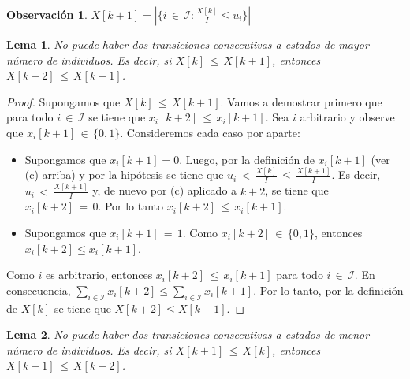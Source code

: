 \documentclass{article}
\newtheorem{lema}{Lema}
\newtheorem{obs}{Observación}
\begin{document}
\begin{obs}
$X[k{+}1]=|\{i\,{\in}\,\mathcal{I}:\frac{X[k]}{I}\leq u_i\}|$
\end{obs}

\begin{lema}\label{lema1}
No puede haber dos transiciones consecutivas a estados de mayor número de individuos. Es decir, si $X[k]\,{\leq}\,X[k{+}1]$, entonces $X[k{+}2]\,{\leq}\, X[k{+}1]$.
\end{lema}
\begin{proof}
Supongamos que $X[k]\,{\leq}\,X[k{+}1]$. Vamos a demostrar primero que para todo $i\,{\in}\,\mathcal{I}$ se tiene que $x_i[k{+}2]\,{\leq}\, x_i[k{+}1]$. Sea $i$ arbitrario y observe que $x_i[k{+}1]\,{\in}\,\{0, 1\}$. Consideremos cada caso por aparte:
%
\begin{itemize}
\item Supongamos que $x_i[k{+}1]=0$. Luego, por la definición de $x_i[k{+}1]$ (ver (c) arriba) y por la hipótesis se tiene que $u_i\,{<}\,\frac{X[k]}{I}\,{\leq}\,\frac{X[k{+}1]}{I}$. Es decir, $u_i\,{<}\,\frac{X[k{+}1]}{I}$ y, de nuevo por (c) aplicado a $k{+}2$, se tiene que $x_i[k{+}2]\,{=}\,0$. Por lo tanto $x_i[k{+}2]\,{\leq}\,x_i[k{+}1]$.
\item Supongamos que $x_i[k{+}1]\,{=}\,1$. Como $x_i[k{+}2]\,{\in}\,\{0,1\}$, entonces $x_i[k{+}2]\leq x_i[k{+}1]$.
\end{itemize}
%
Como $i$ es arbitrario, entonces $x_i[k{+}2]\,{\leq}\, x_i[k{+}1]$ para todo $i\,{\in}\,\mathcal{I}$. En consecuencia, $\sum_{i\in\mathcal{I}} x_i[k{+}2]\leq \sum_{i\in\mathcal{I}} x_i[k{+}1]$. Por lo tanto, por la definición de $X[k]$ se tiene que $X[k{+}2]\leq X[k{+}1]$.
\end{proof}

\begin{lema}\label{lema2}
No puede haber dos transiciones consecutivas a estados de menor número de individuos. Es decir, si $X[k{+}1]\,{\leq}\,X[k]$, entonces $X[k{+}1]\,{\leq}\, X[k{+}2]$.
\end{lema}
\end{document}
